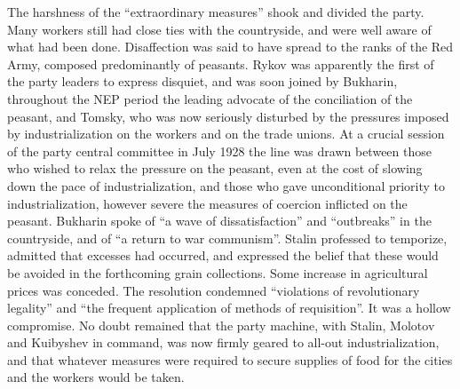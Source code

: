 The harshness of the ``extraordinary measures'' shook and divided the party. Many workers still had close ties with the countryside, and were well aware of what had been done. Disaffection was said to have spread to the ranks of the Red Army, composed predominantly of peasants. Rykov was apparently the first of the party leaders to express disquiet, and was soon joined by Bukharin, throughout the NEP period the leading advocate of the conciliation of the peasant, and Tomsky, who was now seriously disturbed by the pressures imposed by industrialization on the workers and on the trade unions. At a crucial session of the party central committee in July 1928 the line was drawn between those who wished to relax the pressure on the peasant, even at the cost of slowing down the pace of industrialization, and those who gave unconditional priority to industrialization, however severe the measures of coercion inflicted on the peasant. Bukharin spoke of ``a wave of dissatisfaction'' and ``outbreaks'' in the countryside, and of ``a return to war communism''. Stalin professed to temporize, admitted that excesses had occurred, and expressed the belief that these would be avoided in the forthcoming grain collections. Some increase in agricultural prices was conceded. The resolution condemned ``violations of revolutionary legality'' and ``the frequent application of methods of requisition''. It was a hollow compromise. No doubt remained that the party machine, with Stalin, Molotov and Kuibyshev in command, was now firmly geared to all-out industrialization, and that whatever measures were required to secure supplies of food for the cities and the workers would be taken. 

